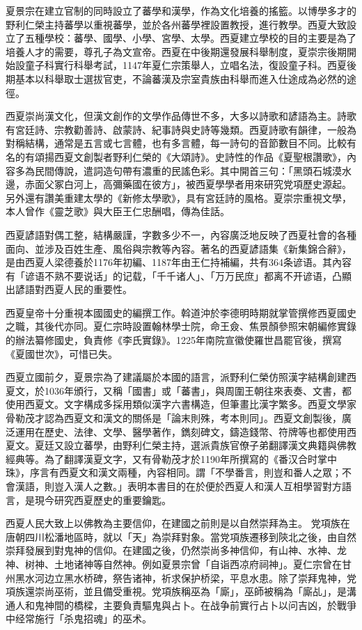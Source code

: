 夏景宗在建立官制的同時設立了蕃學和漢學，作為文化培養的搖籃。以博學多才的野利仁榮主持蕃學以重視蕃學，並於各州蕃學裡設置教授，進行教學。西夏大致設立了五種學校：蕃學、國學、小學、宮學、太學。西夏建立學校的目的主要是為了培養人才的需要，尊孔子為文宣帝。西夏在中後期還發展科舉制度，夏崇宗後期開始設童子科實行科舉考試，1147年夏仁宗策舉人，立唱名法，復設童子科。西夏後期基本以科舉取士選拔官吏，不論蕃漢及宗室貴族由科舉而進入仕途成為必然的途徑。

西夏崇尚漢文化，但漢文創作的文學作品傳世不多，大多以詩歌和諺語為主。詩歌有宮廷詩、宗教勸善詩、啟蒙詩、紀事詩與史詩等幾類。西夏詩歌有韻律，一般為對稱結構，通常是五言或七言體，也有多言體，每一詩句的音節數目不同。比較有名的有頌揚西夏文創製者野利仁榮的《大頌詩》。史詩性的作品《夏聖根讚歌》，內容多為民間傳說，遣詞造句帶有濃重的民謠色彩。其中開首三句：「黑頭石城漠水邊，赤面父冢白河上，高彌藥國在彼方」，被西夏學學者用來研究党項歷史源起。另外還有讚美重建太學的《新修太學歌》，具有宮廷詩的風格。夏崇宗重視文學，本人曾作《靈芝歌》與大臣王仁忠酬唱，傳為佳話。

西夏諺語對偶工整，結構嚴謹，字數多少不一，內容廣泛地反映了西夏社會的各種面向、並涉及百姓生產、風俗與宗教等內容。著名的西夏諺語集《新集錦合辭》，是由西夏人梁德養於1176年初編、1187年由王仁持補編，共有364条谚语。其內容有「谚语不熟不要说话」的记载，「千千诸人」、「万万民庶」都离不开谚语，凸顯出諺語對西夏人民的重要性。

西夏皇帝十分重視本國國史的編撰工作。斡道沖於李德明時期就掌管撰修西夏國史之職，其後代亦同。夏仁宗時設置翰林學士院，命王僉、焦景顏參照宋朝編修實錄的辦法纂修國史，負責修《李氏實錄》。1225年南院宣徽使羅世昌罷官後，撰寫《夏國世次》，可惜已失。

西夏立國前夕，夏景宗為了建議屬於本國的語言，派野利仁榮仿照漢字結構創建西夏文，於1036年頒行，又稱「國書」或「蕃書」，與周圍王朝往來表奏、文書，都使用西夏文。文字構成多採用類似漢字六書構造，但筆畫比漢字繁多。西夏文學家骨勒茂才認為西夏文和漢文的關係是「論末則殊，考本則同」。西夏文創製後，廣泛運用在歷史、法律、文學、醫學著作，鐫刻碑文，鑄造錢幣、符牌等也都使用西夏文。夏廷又設立蕃學，由野利仁榮主持，選派貴族官僚子弟翻譯漢文典籍與佛教經典等。為了翻譯漢夏文字，又有骨勒茂才於1190年所撰寫的《番汉合时掌中珠》，序言有西夏文和漢文兩種，內容相同。謂「不學番言，則豈和番人之眾；不會漢語，則豈入漢人之數。」表明本書目的在於便於西夏人和漢人互相學習對方語言，是現今研究西夏歷史的重要鑰匙。

西夏人民大致上以佛教為主要信仰，在建國之前則是以自然崇拜為主。 党項族在唐朝四川松潘地區時，就以「天」為崇拜對象。當党項族遷移到陝北之後，由自然崇拜發展到對鬼神的信仰。在建國之後，仍然崇尚多神信仰，有山神、水神、龙神、树神、土地诸神等自然神。例如夏景宗曾「自诣西凉府祠神」。夏仁宗曾在甘州黑水河边立黑水桥碑，祭告诸神，祈求保护桥梁，平息水患。除了崇拜鬼神，党項族還崇尚巫術，並且備受重視。党項族稱巫為「廝」，巫師被稱為「廝乩」，是溝通人和鬼神間的橋樑，主要負責驅鬼與占卜。在战争前實行占卜以问吉凶，於戰爭中经常施行「杀鬼招魂」的巫术。

